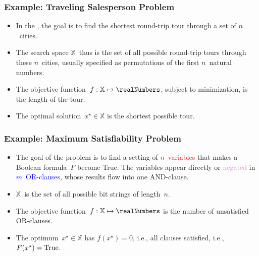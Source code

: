 \documentclass[aspectratio=169,mathserif,notheorems]{beamer}%
\gdef\searchSpace{\ensuremath{\mathbb{X}}}%
\gdef\sespel{\ensuremath{x}}%
\gdef\opti#1{\ensuremath{#1^{\star}}}%
\begin{document}
%
\begin{frame}%
\frametitle{Example: Traveling Salesperson Problem}%
\parbox{0.373\paperwidth}{%
\begin{itemize}%
%
\item In the \cite{ABCC2006TTSPACS,LLRKS1985TTSPAGTOCO}, the goal is to find the shortest round-trip tour through a set of $n$~cities.%
%
\item<2-> The search space \searchSpace\ thus is the set of all possible round-trip tours through these $n$~cities, usually specified as permutations of the first $n$~natural numbers.%
%
\item<3-> The objective function~$f:\searchSpace\mapsto\realNumbers$, subject to minimization, is the length of the tour.%
%
\item<4-> The optimal solution~$\opti{\sespel}\in\searchSpace$ is the shortest possible tour.%
%
\end{itemize}%
}%
%
%
%
%
\end{frame}%
%
\begin{frame}%
\frametitle{Example: Maximum Satisfiability Problem}%
\parbox{0.42\paperwidth}{%
\begin{itemize}%
%
\item The goal of the \cite{HS2004SLSFAA,C1971TCOTPP} problem is to find a setting of \textcolor<2>{red}{$n$~variables} that makes a Boolean formula~$F$ become True. %
The variables appear directly or \textcolor<3>{violet}{negated} in \textcolor<4>{blue}{$m$~OR\nobreakdashes-clauses}, whose results flow into \textcolor<5>{green!40!black}{one AND\nobreakdashes-clause}.%
%
\item<6-> \searchSpace\ is the set of all possible bit strings of length~$n$.%
%
\item<7-> The objective function~$f:\searchSpace\mapsto\realNumbers$ is the number of unsatisfied OR\nobreakdashes-clauses.%
%
\item<8-> The optimum~$\opti{\sespel}\in\searchSpace$ has $f(\opti{\sespel})=0$, i.e., all clauses satisfied, i.e., $F(\opti{\sespel})=\textnormal{True}$.%
%
\end{itemize}%
}%
%
%
%
%
%
%
%
\end{frame}%
\end{document}
